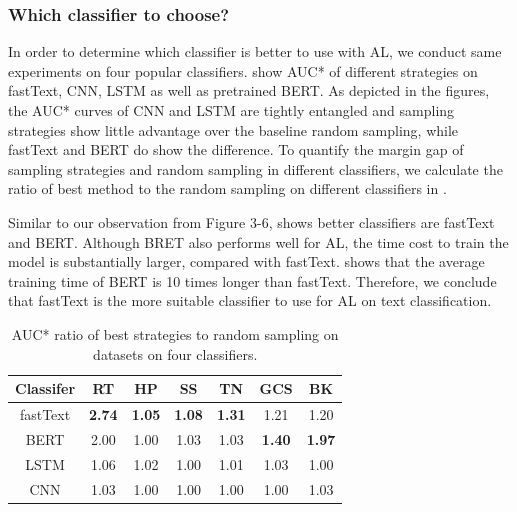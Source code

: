 \subsubsection{Which classifier to choose?}
In order to determine which classifier is better to use with AL, we conduct same experiments on four popular classifiers.  show AUC* of different strategies on fastText, CNN, LSTM as well as pretrained BERT. As depicted in the figures, 
the AUC* curves of CNN and LSTM are tightly entangled and 
sampling strategies show little advantage over the baseline random sampling, 
while fastText and BERT do show the difference. To quantify the margin gap 
of sampling strategies and random sampling in different classifiers, 
we calculate the ratio of best method to the random sampling on 
different classifiers in .

Similar to our observation from Figure 3-6,  
shows better classifiers are fastText and BERT. Although BRET also 
performs well for AL, the time cost to train the model is substantially
larger, compared with fastText.  shows that 
the average training time of BERT is 10 times longer than fastText. 
Therefore, we conclude that fastText is the more suitable classifier to use 
for AL on text classification.
\begin{table}[th]
 \scriptsize
 \centering
 \begin{tabular}{ccccccc}
  \toprule
  Classifer & RT & HP& SS & TN & GCS & BK\\ \hline
  fastText & \textbf{2.74} & \textbf{1.05} & \textbf{1.08} & \textbf{1.31} & 1.21 & 1.20\\
  BERT & 2.00 & 1.00 & 1.03  & 1.03 & \textbf{1.40} & \textbf{1.97}\\ 
  LSTM & 1.06 & 1.02 & 1.00  & 1.01 & 1.03 & 1.00\\
  CNN & 1.03 & 1.00  & 1.00 & 1.00 & 1.00 & 1.03\\  
  \bottomrule              
 \end{tabular}
\caption{AUC* ratio of best strategies to random sampling on datasets on four classifiers.}
\label{table:ratioOfClassifiers}
\end{table}

